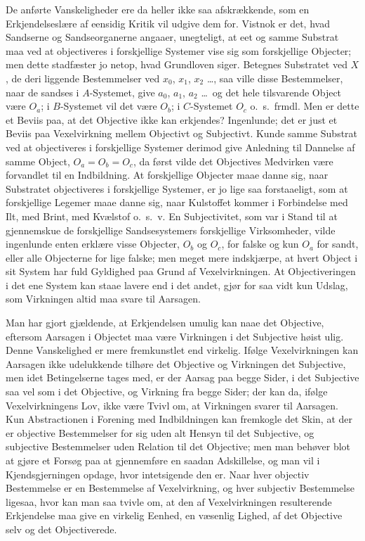 \documentclass[12pt]{book}
\newcommand{\apage}[1]{\marginnote{\footnotesize\textit{[#1]}}}
\begin{document}
De anførte Vanskeligheder ere da heller ikke saa afskrækkende, som en
Erkjendelseslære af eensidig Kritik vil udgive dem for. Vistnok er det,
hvad Sandserne og Sandseorganerne angaaer, unegteligt, at eet og samme
Substrat maa ved at objectiveres i forskjellige Systemer vise sig som
forskjellige Objecter; men dette stadfæster jo netop, hvad Grundloven
siger. Betegnes Substratet ved $X$, de deri liggende Bestemmelser ved
$x_0$, $x_1$, $x_2$ \ldots, saa ville disse Bestemmelser, naar de sandses i
$A$-Systemet, give $a_0$, $a_1$, $a_2$ \ldots\ og det hele tilsvarende
Object være $O_a$; i $B$-Systemet vil det være $O_b$; i $C$-Systemet $O_c$
o.\ s.\ frmdl. Men er dette et Beviis paa, at det Objective ikke kan
erkjendes?  \apage{55} Ingenlunde; det er just et Beviis paa Vexelvirkning mellem
Objectivt og Subjectivt. Kunde samme Substrat ved at objectiveres i
forskjellige Systemer derimod give Anledning til Dannelse af samme Object,
$O_a = O_b = O_c$, da først vilde det Objectives Medvirken være forvandlet
til en Indbildning. At forskjellige Objecter maae danne sig, naar
Substratet objectiveres i forskjellige Systemer, er jo lige saa
forstaaeligt, som at forskjellige Legemer maae danne sig, naar Kulstoffet
kommer i Forbindelse med Ilt, med Brint, med Kvælstof o.\ s.\ v. En
Subjectivitet, som var i Stand til at gjennemskue de forskjellige
Sandsesystemers forskjellige Virksomheder, vilde ingenlunde enten erklære
visse Objecter, $O_b$ og $O_c$, for falske og kun $O_a$ for sandt, eller
alle Objecterne for lige falske; men meget mere indskjærpe, at hvert
Object i sit System har fuld Gyldighed paa Grund af Vexelvirkningen. At
Objectiveringen i det ene System kan staae lavere end i det andet, gjør
for saa vidt kun Udslag, som Virkningen altid maa svare til Aarsagen.

Man har gjort gjældende, at Erkjendelsen umulig kan naae det Objective,
eftersom Aarsagen i Objectet maa være Virkningen i det Subjective høist
ulig. Denne Vanskelighed er mere fremkunstlet end virkelig. Ifølge
Vexelvirkningen kan Aarsagen ikke udelukkende tilhøre det Objective og
Virkningen det Subjective, men idet Betingelserne tages med, er der Aarsag
paa begge Sider, i det Subjective saa vel som i det Objective, og Virkning
fra begge Sider; der kan da, ifølge Vexelvirkningens Lov, ikke være Tvivl
om, at Virkningen \apage{56} svarer til Aarsagen. Kun Abstractionen i Forening med
Indbildningen kan fremkogle det Skin, at der er objective Bestemmelser for
sig uden alt Hensyn til det Subjective, og subjective Bestemmelser uden
Relation til det Objective; men man behøver blot at gjøre et Forsøg paa at
gjennemføre en saadan Adskillelse, og man vil i Kjendsgjerningen opdage,
hvor intetsigende den er. Naar hver objectiv Bestemmelse er en Bestemmelse
af Vexelvirkning, og hver subjectiv Bestemmelse ligesaa, hvor kan man saa
tvivle om, at den af Vexelvirkningen resulterende Erkjendelse maa give en
virkelig Eenhed, en væsenlig Lighed, af det Objective selv og det
Objectiverede.
\end{document}
